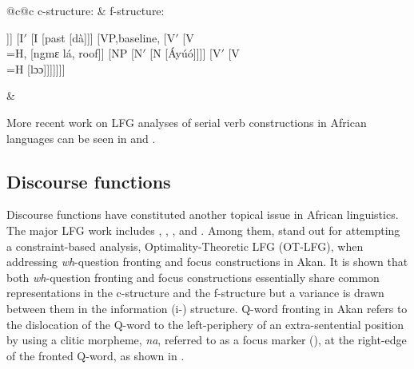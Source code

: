 \documentclass[output=paper,hidelinks]{langscibook}
\begin{document}
\ea\label{ex:African:55}
\begin{tabular}[t]{@{}c@{}c}
  c-structure: & f-structure:\\[1ex]
{\begin{forest}
    [IP [ NP [ N [ Báyúó ]]]
      [I$'$ [I [past [d\`{a}]]]
            [VP,baseline, [V$'$ [{V\\\UP=H\DOWN}, [{ngmɛ lá}, roof]]
              [NP [N$'$ [N [Áyúó]]]]
              [V$'$ [{V\\\UP=H\DOWN} [lɔɔ]]]]]]]
\end{forest}} &
{}
\end{tabular}
\z\clearpage

More recent work on LFG analyses of serial verb constructions in African languages can be seen in \citet{Nyampong2015} and \citet{Lovestrand2018}.

\subsection{Discourse functions}
\label{sec:African:2.7}

Discourse functions have constituted another topical issue in African linguistics. The major LFG work includes \citet{Kanerva1990}, \citet{Bresnan:Mismatches}, \citet{Mchombo2003}, \citet{MB05} \citet{MchomboMorimoto:IS} and \citet{Abubakari2018}. Among them, \citet{MB05} stand out for attempting a constraint-based analysis, Optimality-Theoretic LFG (OT-LFG), when addressing \textit{wh}{}-ques\-tion fronting and focus constructions in Akan. It is shown that both \textit{wh}{}-question fronting and focus constructions essentially share common representations in the c-structure and the f-structure but a variance is drawn between them in the information (i-) structure. Q-word fronting in Akan refers to the dislocation of the Q-word to the left-periphery of an extra-sentential position by using a clitic morpheme, \textit{na}, referred to as a focus marker (\FOCUS), at the right-edge of the fronted Q-word, as shown in .
\end{document}
